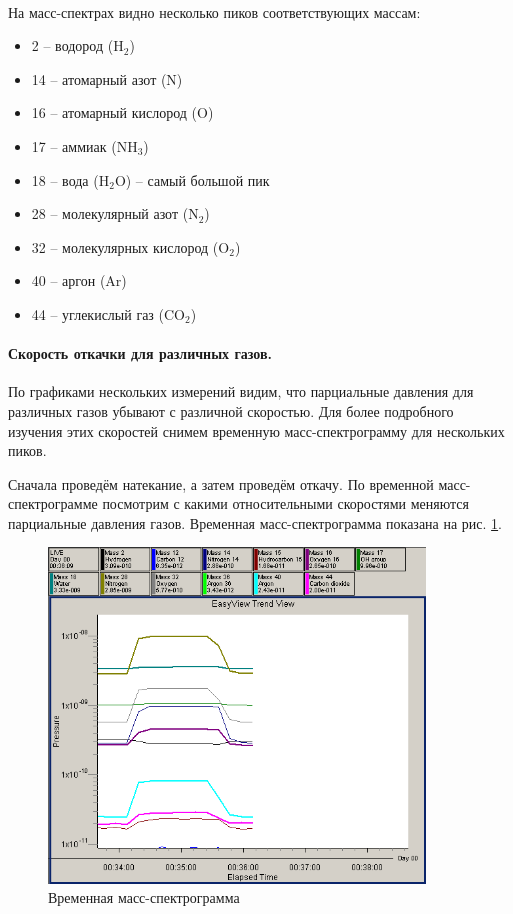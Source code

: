 \documentclass[a4paper,12pt]{article} %
\begin{document}
\paragraph{} На масс-спектрах видно несколько пиков соответствующих массам:
\begin{itemize}
\renewcommand{\labelitemi}{$m_0 = $}
\itemsep0em
\item 2 -- водород (H$_2$)
\item 14 -- атомарный азот (N)
\item 16 -- атомарный кислород (O)
\item 17 -- аммиак (NH$_3$)
\item 18 -- вода (H$_2$O) -- самый большой пик
\item 28 -- молекулярный азот (N$_2$)
\item 32 -- молекулярных кислород (O$_2$)
\item 40 -- аргон (Ar)
\item 44 -- углекислый газ (CO$_2$)
\end{itemize}

\paragraph{Скорость откачки для различных газов.}
По графиками нескольких измерений видим, что парциальные давления для различных газов убывают с различной скоростью. Для более подробного изучения этих скоростей снимем временную масс-спектрограмму для нескольких пиков. 

Сначала проведём натекание, а затем проведём откачу. По временной масс-спектрограмме посмотрим с какими относительными скоростями меняются парциальные давления газов. Временная масс-спектрограмма показана на рис. \ref{time-spect}.

\begin{figure}[h]
\center
\includegraphics[width=10cm]{time-spect.png}
\caption{Временная масс-спектрограмма}
\label{time-spect}
\end{figure}
\end{document}
